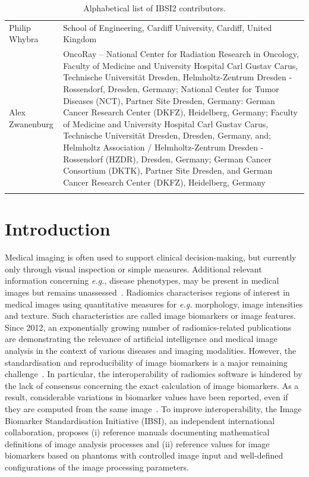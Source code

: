 \documentclass[fleqn,a4paper,oneside,openany]{book}
\begin{document}
\begin{longtable}{p{4cm}p{10cm}}
Philip Whybra
& School of Engineering, Cardiff University, Cardiff, United Kingdom\\ 
Alex Zwanenburg
& OncoRay – National Center for Radiation Research in Oncology, Faculty of Medicine and University Hospital Carl Gustav Carus, Technische Universität Dresden, Helmholtz-Zentrum Dresden - Rossendorf, Dresden, Germany; National Center for Tumor Diseases (NCT), Partner Site Dresden, Germany: German Cancer Research Center (DKFZ), Heidelberg, Germany; Faculty of Medicine and University Hospital Carl Gustav Carus, Technische Universität Dresden, Dresden, Germany, and; Helmholtz Association / Helmholtz-Zentrum Dresden - Rossendorf (HZDR), Dresden, Germany; German Cancer Consortium (DKTK), Partner Site Dresden, and German Cancer Research Center (DKFZ), Heidelberg, Germany\\ 
 
\bottomrule
\caption{Alphabetical list of IBSI2 contributors.\label{participantList}}
\end{longtable}
\newpage
\setcounter{tocdepth}{1}
\tableofcontents

\mainmatter

\chapter{Introduction}
%
Medical imaging is often used to support clinical decision-making, but currently only through visual inspection or simple measures.
Additional relevant information concerning \textit{e.g.}, disease phenotypes, may be present in medical images but remains unassessed~\cite{Lambin2017}.
Radiomics characterises regions of interest in medical images using quantitative measures for \textit{e.g.} morphology, image intensities and texture.
Such characteristics are called image biomarkers or image features.
Since 2012, an exponentially growing number of radiomics-related publications are demonstrating the relevance of artificial intelligence and medical image analysis in the context of various diseases and imaging modalities.
However, the standardisation and reproducibility of image biomarkers is a major remaining challenge~\cite{Zwanenburg2019-ky}.
In particular, the interoperability of radiomics software is hindered by the lack of consensus concerning the exact calculation of image biomarkers.
As a result, considerable variations in biomarker values have been reported, even if they are computed from the same image~\cite{Hatt2017-zp,Bogowicz2017-kh,Foy2018-mx}.
To improve interoperability, the Image Biomarker Standardisation Initiative (IBSI), an independent international collaboration, proposes (i) reference manuals documenting mathematical definitions of image analysis processes and (ii) reference values for image biomarkers based on phantoms with controlled image input and well-defined configurations of the image processing parameters.
\end{document}
